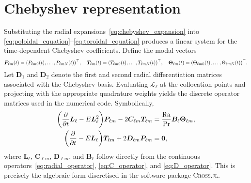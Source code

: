 \documentclass[11pt]{article}
\numberwithin{equation}{section}
\begin{document}
\section{Chebyshev representation}
\label{sec:chebyshev}
Substituting the radial expansions~\eqref{eq:chebyshev_expansion} into \eqref{eq:poloidal_equation}--\eqref{eq:toroidal_equation} produces a linear system for the time-dependent Chebyshev coefficients. Define the modal vectors
\begin{equation}
  \bm{P}_{\ell m}(t) = \qty(P_{\ell m 0}(t), \ldots, P_{\ell m N}(t))^\top, \quad
  \bm{T}_{\ell m}(t) = \qty(T_{\ell m 0}(t), \ldots, T_{\ell m N}(t))^\top,
  \quad
  \bm{\Theta}_{\ell m}(t) = \qty(\Theta_{\ell m 0}(t), \ldots, \Theta_{\ell m N}(t))^\top.
\end{equation}
Let $\bm{D}_1$ and $\bm{D}_2$ denote the first and second radial differentiation matrices associated with the Chebyshev basis. Evaluating $\mathcal{L}_\ell$ at the collocation points and projecting with the appropriate quadrature weights yields the discrete operator matrices used in the numerical code. Symbolically,
\begin{align}
  \qty(\pdv{}{t} \bm{L}_\ell - E \bm{L}_\ell^2) \bm{P}_{\ell m} - 2 \bm{C}_{\ell m} \bm{T}_{\ell m}
  &= \frac{\mathrm{Ra}}{\mathrm{Pr}} \bm{B}_\ell \bm{\Theta}_{\ell m}, \\
  \qty(\pdv{}{t} - E \bm{L}_\ell) \bm{T}_{\ell m}
  + 2 \bm{D}_{\ell m} \bm{P}_{\ell m}
  &= \bm{0},
\end{align}
where $\bm{L}_\ell$, $\bm{C}_{\ell m}$, $\bm{D}_{\ell m}$, and $\bm{B}_\ell$ follow directly from the continuous operators~\eqref{eq:radial_operator}, \eqref{eq:C_operator}, and \eqref{eq:D_operator}. This is precisely the algebraic form discretised in the software package \textsc{Cross.jl}.
\end{document}
